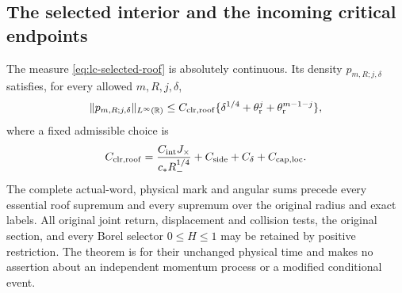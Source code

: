 \subsection{The selected interior and the incoming critical endpoints}

\begin{theorem}
\label{thm:lc-selected-roof-height}
The measure \eqref{eq:lc-selected-roof} is absolutely continuous.
Its density $p_{m,R;j,\delta}$ satisfies, for every allowed
$m,R,j,\delta$,
\begin{equation}\label{eq:lc-roof-height}
 \|p_{m,R;j,\delta}\|_{L^\infty(\mathbb R)}
 \le C_{\rm clr,roof}
       \{\delta^{1/4}+\theta_{\rm r}^{j}
                             +\theta_{\rm r}^{m-1-j}\},
\end{equation}
where a fixed admissible choice is
\begin{equation}\label{eq:lc-roof-constant}
 C_{\rm clr,roof}
  =\frac{C_{\rm int}J_\times}{c_*R_-^{1/4}}
                         +C_{\rm side}+C_{\delta}+C_{\rm cap,loc}.
\end{equation}
The complete actual-word, physical mark and angular sums precede
every essential roof supremum and every supremum over the original
radius and exact labels.  All original joint return, displacement
and collision tests, the original section, and every Borel selector
$0\le H\le1$ may be retained by positive restriction.  The theorem
is for their unchanged physical time and makes no assertion about
an independent momentum process or a modified conditional event.
\end{theorem}
